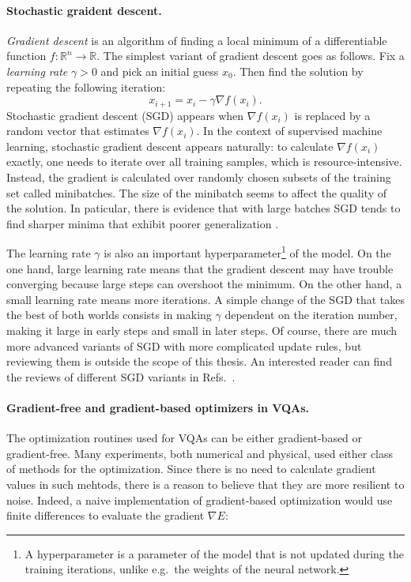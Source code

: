 \paragraph{Stochastic graident descent.}
\textit{Gradient descent} is an algorithm of finding a local minimum of a differentiable function $f: \mathbb{R}^n \rightarrow \mathbb{R}$. The simplest variant of gradient descent goes as follows. Fix a \textit{learning rate} $\gamma > 0$ and pick an initial guess $x_0$. Then find the solution by repeating the following iteration:
\begin{equation}
    x_{i+1} = x_i - \gamma \nabla f(x_i).
\end{equation}
Stochastic gradient descent (SGD) appears when $\nabla f(x_i)$ is replaced by a random vector that estimates $\nabla f(x_i)$. In the context of supervised machine learning, stochastic gradient descent appears naturally: to calculate $\nabla f(x_i)$ exactly, one needs to iterate over all training samples, which is resource-intensive. Instead, the gradient is calculated over randomly chosen subsets of the training set called minibatches. The size of the minibatch seems to affect the quality of the solution. In paticular, there is evidence that with large batches SGD tends to find sharper minima that exhibit poorer generalization \cite{keskar_large-batch_2017}.

The learning rate $\gamma$ is also an important hyperparameter\footnote{A hyperparameter is a parameter of the model that is not updated during the training iterations, unlike e.g.~the weights of the neural network.} of the model. On the one hand, large learning rate means that the gradient descent may have trouble converging because large steps can overshoot the minimum. On the other hand, a small learning rate means more iterations. A simple change of the SGD that takes the best of both worlds consists in making $\gamma$ dependent on the iteration number, making it large in early steps and small in later steps. Of course, there are much more advanced variants of SGD with more complicated update rules, but reviewing them is outside the scope of this thesis. An interested reader can find the reviews of different SGD variants in Refs.~\cite{ruder_overview_2017,mehta_high-bias_2019}.

\paragraph{Gradient-free and gradient-based optimizers in VQAs.}

The optimization routines used for VQAs can be either gradient-based or gradient-free. Many experiments, both numerical and physical, used either class of methods for the optimization. Since there is no need to calculate gradient values in such mehtods, there is a reason to believe that they are more resilient to noise. Indeed, a naive implementation of gradient-based optimization would use finite differences to evaluate the gradient $\nabla E$:

